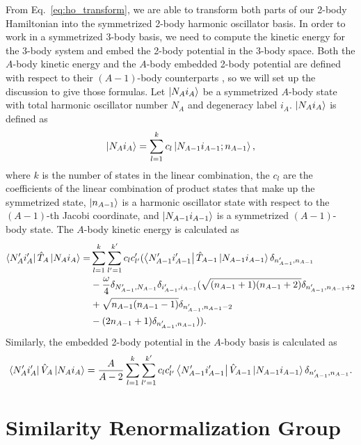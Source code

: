 From Eq.~\ref{eq:ho_transform}, we are able to transform both parts of our 2-body Hamiltonian into the symmetrized 2-body harmonic oscillator basis. In order to work in a symmetrized 3-body basis, we need to compute the kinetic energy for the 3-body system and embed the 2-body potential in the 3-body space. Both the $A$-body kinetic energy and the $A$-body embedded 2-body potential are defined with respect to their $(A-1)$-body counterparts \cite{Jurgenson:2008jp}, so we will set up the discussion to give those formulas. Let $\ket{N_A i_A}$ be a symmetrized $A$-body state with total harmonic oscillator number $N_A$ and degeneracy label $i_A$. $\ket{N_A i_A}$ is defined as
\begin{equation}
\ket{N_A i_A} = \sum_{l=1}^k c_l \ket{N_{A-1} i_{A-1}; n_{A-1}},
\end{equation}
where $k$ is the number of states in the linear combination, the $c_l$ are the coefficients of the linear combination of product states that make up the symmetrized state, $\ket{n_{A-1}}$ is a harmonic oscillator state with respect to the $(A-1)$-th Jacobi coordinate, and $\ket{N_{A-1} i_{A-1}}$ is a symmetrized $(A-1)$-body state. The $A$-body kinetic energy is calculated as
\begin{equation}
\begin{aligned}
\bra{N_A' i_A'}\hat{T}_A\ket{N_A i_A} = & \sum_{l=1}^k \sum_{l'=1}^{k'} c_l c_{l'}' (\bra{N_{A-1}'
i_{A-1}'}\hat{T}_{A-1}\ket{N_{A-1} i_{A-1}}\delta_{n_{A-1}',n_{A-1}} \\
                                        & -
                                        \frac{\omega}{4}\delta_{N_{A-1}',N_{A-1}}\delta_{i_{A-1}',i_{A-1}}(\sqrt{(n_{A-1} + 1)(n_{A-1} + 2)}\delta_{n_{A-1}',n_{A-1} + 2} \\
& + \sqrt{n_{A-1}(n_{A-1} - 1)}\delta_{n_{A-1}',n_{A-1} - 2} \\
& - (2 n_{A-1} + 1)\delta_{n_{A-1}',n_{A-1}})).
\end{aligned}
\end{equation}
Similarly, the embedded 2-body potential in the $A$-body basis is calculated as
\begin{equation}
\bra{N_A' i_A'}\hat{V}_A\ket{N_A i_A} = \frac{A}{A-2} \sum_{l=1}^k \sum_{l'=1}^{k'} c_l c_{l'}'
\bra{N_{A-1}' i_{A-1}'}\hat{V}_{A-1}\ket{N_{A-1} i_{A-1}}\delta_{n_{A-1}',n_{A-1}}.
\end{equation}

\section{Similarity Renormalization Group}

